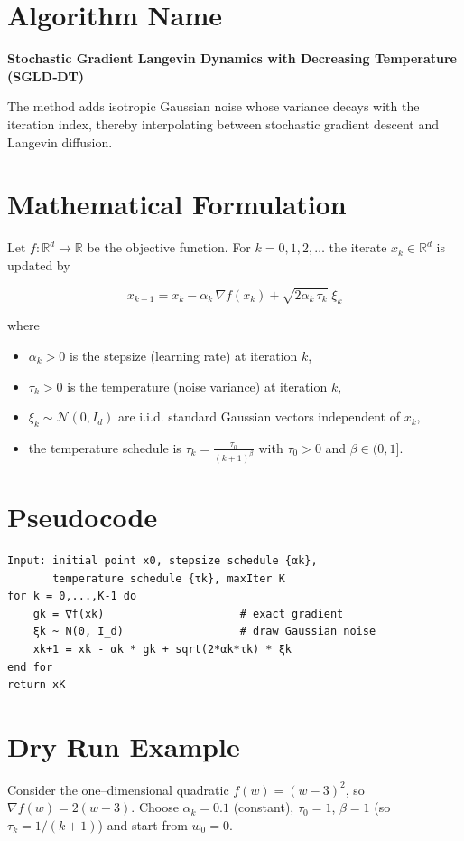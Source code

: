 \documentclass{article}
\newcommand{\R}{\mathbb{R}}
\begin{document}
\section*{Algorithm Name}
\textbf{Stochastic Gradient Langevin Dynamics with Decreasing Temperature (SGLD‑DT)}  

The method adds isotropic Gaussian noise whose variance decays with the iteration index, thereby interpolating between stochastic gradient descent and Langevin diffusion.

\section*{Mathematical Formulation}
Let $f:\R^{d}\to\R$ be the objective function.  
For $k=0,1,2,\dots$ the iterate $x_{k}\in\R^{d}$ is updated by  

\[
\boxed{
x_{k+1}=x_{k}-\alpha_{k}\,\nabla f(x_{k})+\sqrt{2\alpha_{k}\,\tau_{k}}\;\xi_{k}
}
\tag{1}
\]

where  

\begin{itemize}
  \item $\alpha_{k}>0$ is the stepsize (learning rate) at iteration $k$,
  \item $\tau_{k}>0$ is the temperature (noise variance) at iteration $k$,
  \item $\xi_{k}\sim\mathcal N(0,I_{d})$ are i.i.d. standard Gaussian vectors independent of $x_{k}$,
  \item the temperature schedule is \(\displaystyle \tau_{k}= \frac{\tau_{0}}{(k+1)^{\beta}}\) with $\tau_{0}>0$ and $\beta\in(0,1]$.
\end{itemize}

\section*{Pseudocode}
\begin{verbatim}
Input: initial point x0, stepsize schedule {αk}, 
       temperature schedule {τk}, maxIter K
for k = 0,...,K-1 do
    gk = ∇f(xk)                     # exact gradient
    ξk ~ N(0, I_d)                  # draw Gaussian noise
    xk+1 = xk - αk * gk + sqrt(2*αk*τk) * ξk
end for
return xK
\end{verbatim}

\section*{Dry Run Example}
Consider the one–dimensional quadratic $f(w)=(w-3)^{2}$, so $\nabla f(w)=2(w-3)$.  
Choose $\alpha_{k}=0.1$ (constant), $\tau_{0}=1$, $\beta=1$ (so $\tau_{k}=1/(k+1)$) and start from $w_{0}=0$.
\end{document}
